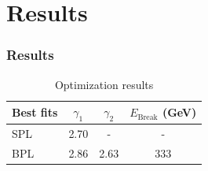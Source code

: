 \documentclass{beamer}
\begin{document}





\section{Results}
\begin{frame}
\frametitle{Results}
\begin{table}
\begin{tabular}{l | c | c | c}
  Best fits & $\gamma_1$ & $\gamma_2$ & $E_{\text{Break}}$ (GeV) \\
  \hline \hline
  SPL & 2.70 & - & -  \\
  BPL & 2.86  & 2.63 & 333
\end{tabular}
\caption{Optimization results}
\end{table}

\end{frame}
\end{document}
